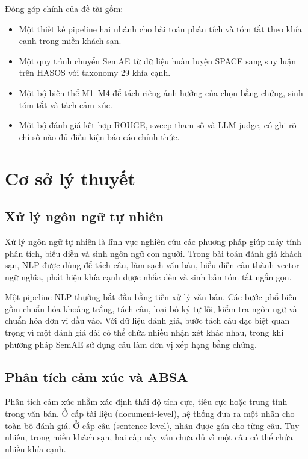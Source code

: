 \documentclass[12pt,a4paper]{report}
\begin{document}
Đóng góp chính của đề tài gồm:

\begin{itemize}[leftmargin=1.2cm]
    \item Một thiết kế pipeline hai nhánh cho bài toán phân tích và tóm tắt theo khía cạnh trong miền khách sạn.
    \item Một quy trình chuyển SemAE từ dữ liệu huấn luyện SPACE sang suy luận trên HASOS với taxonomy 29 khía cạnh.
    \item Một bộ biến thể M1--M4 để tách riêng ảnh hưởng của chọn bằng chứng, sinh tóm tắt và tách cảm xúc.
    \item Một bộ đánh giá kết hợp ROUGE, sweep tham số và LLM judge, có ghi rõ chỉ số nào đủ điều kiện báo cáo chính thức.
\end{itemize}

\chapter{Cơ sở lý thuyết}

\section{Xử lý ngôn ngữ tự nhiên}

Xử lý ngôn ngữ tự nhiên là lĩnh vực nghiên cứu các phương pháp giúp máy tính phân tích, biểu diễn và sinh ngôn ngữ con người. Trong bài toán đánh giá khách sạn, NLP được dùng để tách câu, làm sạch văn bản, biểu diễn câu thành vector ngữ nghĩa, phát hiện khía cạnh được nhắc đến và sinh bản tóm tắt ngắn gọn.

Một pipeline NLP thường bắt đầu bằng tiền xử lý văn bản. Các bước phổ biến gồm chuẩn hóa khoảng trắng, tách câu, loại bỏ ký tự lỗi, kiểm tra ngôn ngữ và chuẩn hóa đơn vị đầu vào. Với dữ liệu đánh giá, bước tách câu đặc biệt quan trọng vì một đánh giá dài có thể chứa nhiều nhận xét khác nhau, trong khi phương pháp SemAE sử dụng câu làm đơn vị xếp hạng bằng chứng.

\section{Phân tích cảm xúc và ABSA}

Phân tích cảm xúc nhằm xác định thái độ tích cực, tiêu cực hoặc trung tính trong văn bản. Ở cấp tài liệu (document-level), hệ thống đưa ra một nhãn cho toàn bộ đánh giá. Ở cấp câu (sentence-level), nhãn được gán cho từng câu. Tuy nhiên, trong miền khách sạn, hai cấp này vẫn chưa đủ vì một câu có thể chứa nhiều khía cạnh.
\end{document}
